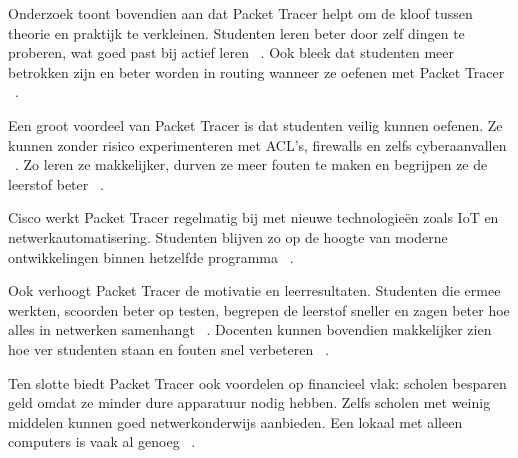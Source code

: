 \vspace{0.3cm}

Onderzoek toont bovendien aan dat Packet Tracer helpt om de kloof tussen theorie en praktijk te verkleinen. Studenten leren beter door zelf dingen te proberen, wat goed past bij actief leren ~\autocite{Noor2018}. Ook bleek dat studenten meer betrokken zijn en beter worden in routing wanneer ze oefenen met Packet Tracer ~\autocite{Noor2018}.

\vspace{0.3cm}

Een groot voordeel van Packet Tracer is dat studenten veilig kunnen oefenen. Ze kunnen zonder risico experimenteren met ACL’s, firewalls en zelfs cyberaanvallen ~\autocite{Allison2022}. Zo leren ze makkelijker, durven ze meer fouten te maken en begrijpen ze de leerstof beter ~\autocite{Allison2022}.

\vspace{0.3cm}

Cisco werkt Packet Tracer regelmatig bij met nieuwe technologieën zoals IoT en netwerkautomatisering. Studenten blijven zo op de hoogte van moderne ontwikkelingen binnen hetzelfde programma ~\autocite{CiscoPacketTracerFAQ}.

\vspace{0.3cm}

Ook verhoogt Packet Tracer de motivatie en leerresultaten. Studenten die ermee werkten, scoorden beter op testen, begrepen de leerstof sneller en zagen beter hoe alles in netwerken samenhangt ~\autocite{Javid2014}. Docenten kunnen bovendien makkelijker zien hoe ver studenten staan en fouten snel verbeteren ~\autocite{Javid2014}.

\vspace{0.3cm}

Ten slotte biedt Packet Tracer ook voordelen op financieel vlak: scholen besparen geld omdat ze minder dure apparatuur nodig hebben. Zelfs scholen met weinig middelen kunnen goed netwerkonderwijs aanbieden. Een lokaal met alleen computers is vaak al genoeg ~\autocite{Makasiranondh2010}.



\subsection{}
\label{sec:Beperkingen}

